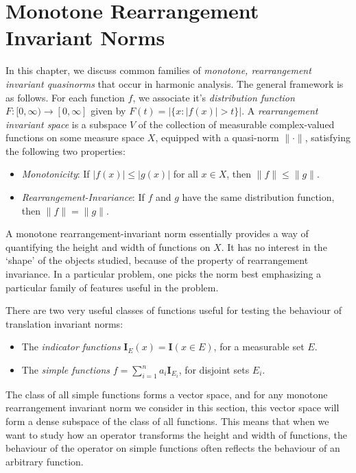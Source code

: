 \chapter{Monotone Rearrangement Invariant Norms}

In this chapter, we discuss common families of \emph{monotone, rearrangement invariant quasinorms} that occur in harmonic analysis. The general framework is as follows. For each function $f$, we associate it's \emph{distribution function} $F: [0,\infty) \to [0,\infty]$ given by $F(t) = |\{ x : |f(x)| > t \}|$. A \emph{rearrangement invariant space} is a subspace $V$ of the collection of measurable complex-valued functions on some measure space $X$, equipped with a quasi-norm $\| \cdot \|$, satisfying the following two properties:
%
\begin{itemize}
    \item \emph{Monotonicity}: If $|f(x)| \leq |g(x)|$ for all $x \in X$, then $\| f \| \leq \| g \|$.

    \item \emph{Rearrangement-Invariance}: If $f$ and $g$ have the same distribution function, then $\| f \| = \| g \|$.
\end{itemize}
%
A monotone rearrangement-invariant norm essentially provides a way of quantifying the height and width of functions on $X$. It has no interest in the `shape' of the objects studied, because of the property of rearrangement invariance. In a particular problem, one picks the norm best emphasizing a particular family of features useful in the problem.

There are two very useful classes of functions useful for testing the behaviour of translation invariant norms:
%
\begin{itemize}
    \item The \emph{indicator functions} $\mathbf{I}_E(x) = \mathbf{I}(x \in E)$, for a measurable set $E$.
    \item The \emph{simple functions} $f = \sum_{i = 1}^n a_i \mathbf{I}_{E_i}$, for disjoint sets $E_i$.
\end{itemize}
%
The class of all simple functions forms a vector space, and for any monotone rearrangement invariant norm we consider in this section, this vector space will form a dense subspace of the class of all functions. This means that when we want to study how an operator transforms the height and width of functions, the behaviour of the operator on simple functions often reflects the behaviour of an arbitrary function.

